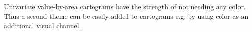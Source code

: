 Univariate value-by-area cartograms have the strength of not needing any color. Thus a second theme can be easily added to cartograms e.g. by using color as an additional visual channel.